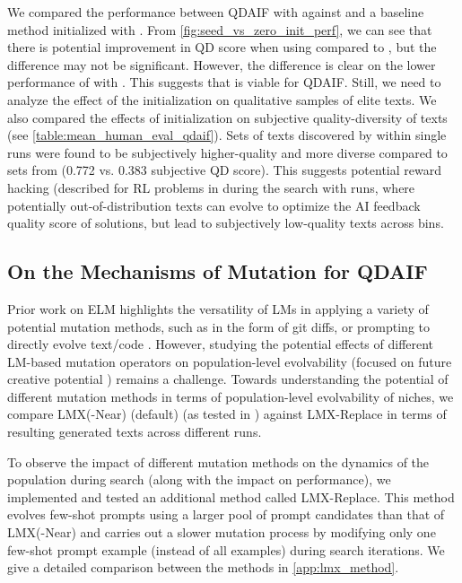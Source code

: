 We compared the performance between QDAIF with \qdaifinitseed{} against \qdaifinitzero{} and a baseline method \basefour{} initialized with \qdaifinitzero. From \cref{fig:seed_vs_zero_init_perf}, we can see that there is potential improvement in QD score when using \qdaifinitseed{} compared to \qdaifinitzero, but the difference may not be significant. However, the difference is clear on the lower performance of \basefour{} with \qdaifinitzero. This suggests that \qdaifinitzero{} is viable for QDAIF. Still, we need to analyze the effect of the initialization on qualitative samples of elite texts. We also compared the effects of initialization on subjective quality-diversity of texts (see \cref{table:mean_human_eval_qdaif}). Sets of texts discovered by \qdaifinitseed{} within single runs were found to be subjectively higher-quality and more diverse compared to sets from \qdaifinitzero{} (0.772 vs. 0.383 subjective QD score). This suggests potential reward hacking (described for RL problems in \citet{skalse2022defining,lehman2019surprising} during the search with \qdaifinitzero{} runs, where potentially out-of-distribution texts can evolve to optimize the AI feedback quality score of solutions, but lead to subjectively low-quality texts across bins.

\subsection{On the Mechanisms of Mutation for QDAIF}\label{app:mutation_method_discussion}

Prior work on ELM highlights the versatility of LMs in applying a variety of potential mutation methods, such as in the form of git diffs, or prompting to directly evolve text/code \cite{lehman2022evolution}. However, studying the potential effects of different LM-based mutation operators on population-level evolvability (focused on future creative potential \cite{lehman2016critical}) remains a challenge. Towards understanding the potential of different mutation methods in terms of population-level evolvability of niches, we compare LMX(-Near) (default) (as tested in \cite{meyerson2023language}) against LMX-Replace in terms of resulting generated texts across different runs.

To observe the impact of different mutation methods on the dynamics of the population during search (along with the impact on performance), we implemented and tested an additional method called LMX-Replace. This method evolves few-shot prompts using a larger pool of prompt candidates than that of LMX(-Near) and carries out a slower mutation process by modifying only one few-shot prompt example (instead of all examples) during search iterations. We give a detailed comparison between the methods in \cref{app:lmx_method}.

